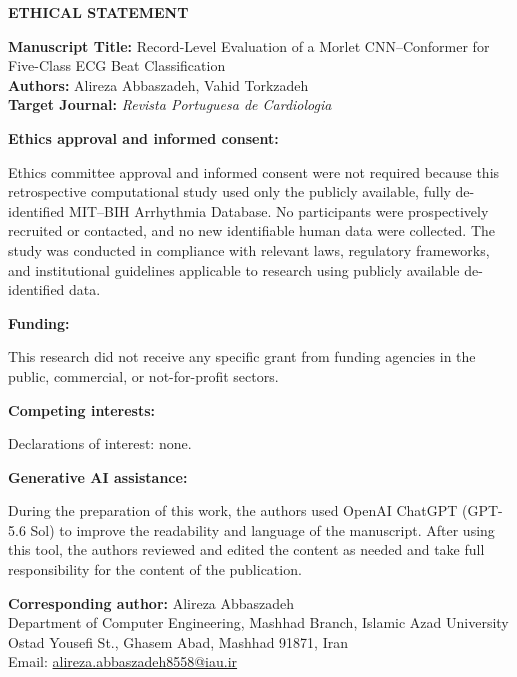 \documentclass[11pt,a4paper]{article}
\begin{document}
\begin{center}
  \textbf{\Large ETHICAL STATEMENT}
\end{center}

\vspace{0.5cm}
\textbf{Manuscript Title:} Record-Level Evaluation of a Morlet CNN--Conformer for Five-Class ECG Beat Classification\\
\textbf{Authors:} Alireza Abbaszadeh, Vahid Torkzadeh\\
\textbf{Target Journal:} \textit{Revista Portuguesa de Cardiologia}

\vspace{0.5cm}
\textbf{Ethics approval and informed consent:}

Ethics committee approval and informed consent were not required because this retrospective computational study used only the publicly available, fully de-identified MIT--BIH Arrhythmia Database. No participants were prospectively recruited or contacted, and no new identifiable human data were collected. The study was conducted in compliance with relevant laws, regulatory frameworks, and institutional guidelines applicable to research using publicly available de-identified data.

\vspace{0.5cm}
\textbf{Funding:}

This research did not receive any specific grant from funding agencies in the public, commercial, or not-for-profit sectors.

\vspace{0.5cm}
\textbf{Competing interests:}

Declarations of interest: none.

\vspace{0.5cm}
\textbf{Generative AI assistance:}

During the preparation of this work, the authors used OpenAI ChatGPT (GPT-5.6 Sol) to improve the readability and language of the manuscript. After using this tool, the authors reviewed and edited the content as needed and take full responsibility for the content of the publication.

\vspace{0.6cm}
\textbf{Corresponding author:} Alireza Abbaszadeh\\
Department of Computer Engineering, Mashhad Branch, Islamic Azad University\\
Ostad Yousefi St., Ghasem Abad, Mashhad 91871, Iran\\
Email: \href{mailto:alireza.abbaszadeh8558@iau.ir}{alireza.abbaszadeh8558@iau.ir}
\end{document}
